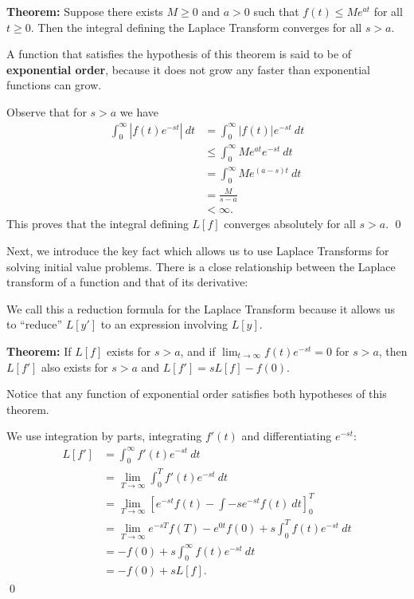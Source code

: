 \documentclass[12pt,letterpaper,twoside]{amsart}
\newcounter{problem}
\begin{document}
{\bf Theorem: }
Suppose there exists $M\geq 0$ and $a>0$ such that $f(t) \leq Me^{at}$ for all $t \geq 0$.  Then the integral defining the Laplace Transform converges for all $s >a$.

A function that satisfies the hypothesis of this theorem is said to be of {\bf exponential order}, because it does not grow any faster than exponential functions can grow.

\bigskip
\proof

Observe that for $s>a$ we have
\begin{align*}
\int_0^\infty | f(t) e^{-st} | \ dt & = \int_0^\infty | f(t)| e^{-st} \ dt \\
& \leq \int_0^\infty Me^{at} e^{-st} \ dt \\
& =  \int_0^\infty M e^{(a-s)t} \ dt \\
& = \frac{M}{s-a} \\
& < \infty.
\end{align*}
This proves that the integral defining $L[f]$ converges absolutely for all $s > a$.
\qed



\bigskip
Next, we introduce the key fact which allows us to use Laplace Transforms for solving initial value problems.  There is a close relationship between the Laplace transform of a function and that of its derivative:

\begin{center}
\fbox{
\begin{minipage}{1.5in}
\[ L[ f' ] = s L [f] - f(0) \]
\end{minipage}
}
\end{center}

We call this a reduction formula for the Laplace Transform because it allows us to ``reduce''  $L[y']$ to an expression involving $L[y]$.

\bigskip
\noindent
{\bf Theorem:} If $L[f]$ exists for $s>a$, and if $\lim_{t \rightarrow \infty} f(t)e^{-st}=0$ for $s > a$, then $L[f']$ also exists for $s>a$ and $L[f']=sL[f]-f(0)$.

\bigskip
Notice that any function of exponential order satisfies both hypotheses of this theorem.

\bigskip
\proof We use integration by parts, integrating $f'(t)$ and differentiating $e^{-st}$:
\begin{align*}
L[f'] & = \int_0^\infty f'(t) e^{-st} \ dt \\
& = \lim_{T \rightarrow \infty} \int_0^T f'(t) e^{-st} \ dt \\
& = \lim_{T \rightarrow \infty} \left[ e^{-st} f(t) - \int -se^{-st} f(t) \ dt \right]_0^T \\
& = \lim_{T \rightarrow \infty} e^{-sT}f(T) - e^{0t} f(0) + s \int_0^T f(t) e^{-st} \ dt \\
& = -f(0) + s \int_0^\infty f(t) e^{-st} \ dt \\
& = -f(0)+sL[f].
\end{align*} 
\qed 
\end{document}
